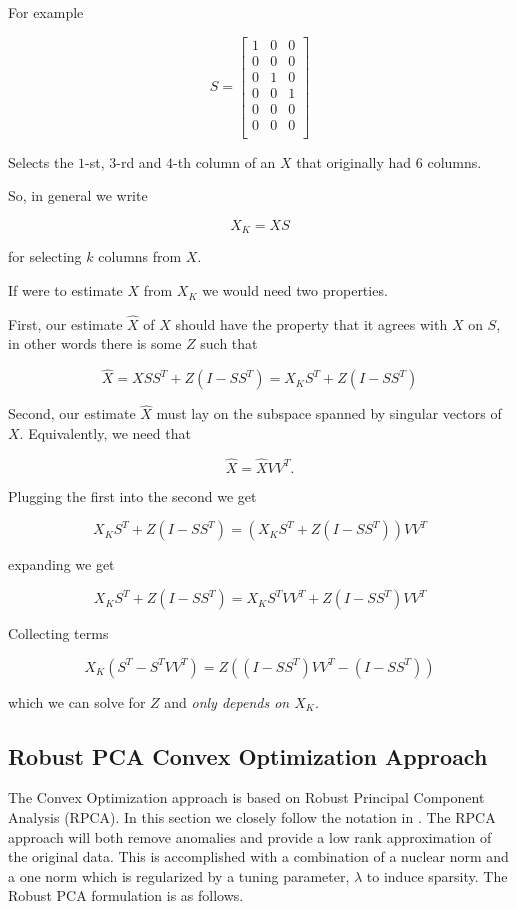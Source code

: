 \documentclass[conference]{IEEEtran}
\begin{document}
For example

$$
S = 
\begin{bmatrix}
1 & 0 & 0 \\
0 & 0 & 0 \\
0 & 1 & 0 \\
0 & 0 & 1 \\
0 & 0 & 0 \\
0 & 0 & 0 \\
\end{bmatrix}
$$

Selects the $1$-st, $3$-rd and $4$-th column of an $X$ that originally had $6$ columns.

So, in general we write 

$$X_K = X S$$

for selecting $k$ columns from $X$.

If were to estimate $X$ from $X_K$ we would need two properties.

First, our estimate $\hat{X}$ of $X$ should have the property that it agrees with $X$ on $S$, in other words there is some $Z$ such that

$$
\hat{X} = X S S^T + Z (I-S S^T) = X_K S^T + Z (I-S S^T)
$$

Second, our estimate $\hat{X}$ must lay on the subspace spanned by singular vectors of $X$.  Equivalently, we need that

$$
\hat{X} = \hat{X} V V^T.
$$

Plugging the first into the second we get

$$
X_K S^T + Z (I-S S^T) = (X_K S^T + Z (I-S S^T)) V V^T 
$$

expanding we get 

$$
X_K S^T + Z (I-S S^T) = X_K S^T V V^T + Z (I-S S^T)V V^T
$$

Collecting terms

$$
X_K (S^T - S^T V V^T) = Z ((I-S S^T)V V^T - (I-S S^T))
$$

which we can solve for $Z$ and \emph{only depends on $X_K$}.

\subsection{Robust PCA Convex Optimization Approach}
The Convex Optimization approach is based on Robust Principal Component Analysis (RPCA). In this section we closely follow the notation in \cite{Paffenroth2012a,Paffenroth2013b,paffenroth2018robust}. The RPCA approach will both remove anomalies and provide a low rank approximation of the original data. This is accomplished with a combination of a nuclear norm and a one norm which is regularized by a tuning parameter, $\lambda$ to induce sparsity. The Robust PCA formulation is as follows.
\end{document}
